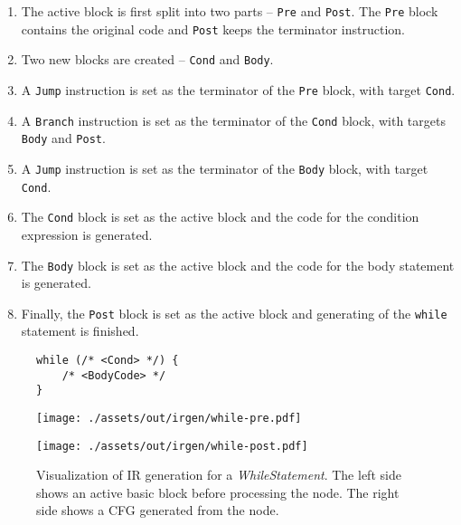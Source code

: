 \begin{enumerate}[noitemsep]
    \item The active block is first split into two parts -- \texttt{Pre} and \texttt{Post}. The \texttt{Pre} block contains the original code and \texttt{Post} keeps the terminator instruction.
    \item Two new blocks are created -- \texttt{Cond} and \texttt{Body}.
    \item A \texttt{Jump} instruction is set as the terminator of the \texttt{Pre} block, with target \texttt{Cond}.
    \item A \texttt{Branch} instruction is set as the terminator of the \texttt{Cond} block, with targets \texttt{Body} and \texttt{Post}.
    \item A \texttt{Jump} instruction is set as the terminator of the \texttt{Body} block, with target \texttt{Cond}.
    \item The \texttt{Cond} block is set as the active block and the code for the condition expression is generated.
    \item The \texttt{Body} block is set as the active block and the code for the body statement is generated.
    \item Finally, the \texttt{Post} block is set as the active block and generating of the \texttt{while} statement is finished.
\end{enumerate}

\begin{figure}[!b]
    \begin{minipage}[t]{1\textwidth}
        \begin{minipage}{0.7\textwidth}
            \begin{verbatim}
while (/* <Cond> */) {
    /* <BodyCode> */
}
            \end{verbatim}
        \end{minipage}
    \end{minipage}
    \vspace{0.5cm}

    \begin{minipage}[t]{0.49\textwidth}
        \vspace*{0mm}
        \centering
        \texttt{[image: ./assets/out/irgen/while-pre.pdf]}
    \end{minipage}
    \begin{minipage}[t]{0.49\textwidth}
        \vspace*{0mm}
        \centering
        \texttt{[image: ./assets/out/irgen/while-post.pdf]}
    \end{minipage}

    \caption{Visualization of IR generation for a \textit{WhileStatement}. The left side shows an active basic block before processing the node. The right side shows a CFG generated from the node.}
    \label{fig:irgen:while}
\end{figure}


